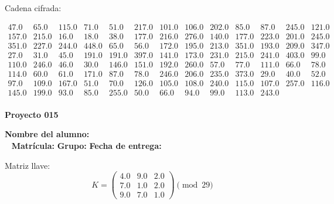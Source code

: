 \documentclass[12pt]{article}
\begin{document}
Cadena cifrada:
\begin{center}
$\begin{array}{lllllllllllll}
47.0 & 65.0 & 115.0 & 71.0 & 51.0 & 217.0 & 101.0 & 106.0 & 202.0 & 85.0 & 87.0 & 245.0 & 121.0\\
157.0 & 215.0 & 16.0 & 18.0 & 38.0 & 177.0 & 216.0 & 276.0 & 140.0 & 177.0 & 223.0 & 201.0 & 245.0\\
351.0 & 227.0 & 244.0 & 448.0 & 65.0 & 56.0 & 172.0 & 195.0 & 213.0 & 351.0 & 193.0 & 209.0 & 347.0\\
27.0 & 31.0 & 45.0 & 191.0 & 191.0 & 397.0 & 141.0 & 173.0 & 231.0 & 215.0 & 241.0 & 403.0 & 99.0\\
110.0 & 246.0 & 46.0 & 30.0 & 146.0 & 151.0 & 192.0 & 260.0 & 57.0 & 77.0 & 111.0 & 66.0 & 78.0\\
114.0 & 60.0 & 61.0 & 171.0 & 87.0 & 78.0 & 246.0 & 206.0 & 235.0 & 373.0 & 29.0 & 40.0 & 52.0\\
97.0 & 109.0 & 167.0 & 51.0 & 70.0 & 126.0 & 105.0 & 108.0 & 240.0 & 115.0 & 107.0 & 257.0 & 116.0\\
145.0 & 199.0 & 93.0 & 85.0 & 255.0 & 50.0 & 66.0 & 94.0 & 99.0 & 113.0 & 243.0\\
\end{array}$
\end{center}

\newpage


\textbf{Proyecto 015}

\textbf{Nombre del alumno:} \underline{\hspace{13cm}}\\\
\vspace{1cm}
\textbf{Matrícula:} \underline{\hspace{4cm}} \hspace{1cm}
\textbf{Grupo:} \underline{\hspace{2cm}}
\textbf{Fecha de entrega:} \underline{\hspace{2cm}}

\medskip

Matriz llave:
\[
K = \begin{pmatrix}
4.0 & 9.0 & 2.0\\
7.0 & 1.0 & 2.0\\
9.0 & 7.0 & 1.0
\end{pmatrix} \pmod{29}
\]
\end{document}
